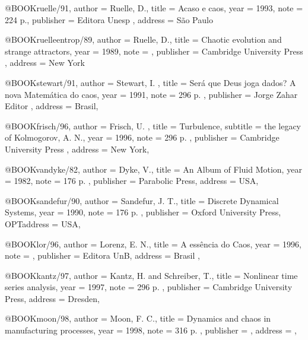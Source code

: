 @BOOK{ruelle/91,
author              = {Ruelle, D.},
title               = {Acaso e caos},
year                = 1993,
note                = {224 p.},
publisher           = {Editora Unesp },
address             = { S\~ao Paulo }
}

@BOOK{ruelleentrop/89,
author              = {Ruelle, D.},
title               = {Chaotic evolution and strange attractors},
year                = 1989,
note                = { },
publisher           = {Cambridge University Press },
address             = { New York }
}

@BOOK{stewart/91,
author              = {Stewart, I. },
title               = {Ser\'a que Deus joga dados? A nova Matem\'atica do caos},
year                = {1991},
note                = {296 p. },
publisher           = {Jorge Zahar Editor },
address             = {Brasil},
}


@BOOK{frisch/96,
author              = {Frisch, U. },
title               = {Turbulence},
subtitle 	    = {the legacy of {Kolmogorov, A. N.}},
year                = {1996},
note                = {296 p. },
publisher           = {Cambridge University Press },
address             = {New York},
}

@BOOK{vandyke/82,
author              = {Dyke, V.},
title               = {An Album of Fluid Motion},
year                = {1982},
note                = {176 p. },
publisher           = {Parabolic Press},
address             = {USA},
}

@BOOK{sandefur/90,
author              = {Sandefur, J. T.},
title               = {Discrete Dynamical Systems},
year                = {1990},
note                = {176 p. },
publisher           = {Oxford University Press},
OPTaddress             = {USA},
}

@BOOK{lor/96,
author              = {Lorenz, E. N.},
title               = {A ess\^encia do Caos},
year                = 1996,
note                = { },
publisher           = {Editora UnB},
address             = { Brasil },
}

@BOOK{kantz/97,
author              = {Kantz, H. and Schreiber, T.},
title               = {Nonlinear time series analysis},
year                = {1997},
note                = {296 p. },
publisher           = {Cambridge University Press},
address             = {Dresden},
}

@BOOK{moon/98,
author              = {Moon, F. C.},
title               = {Dynamics and chaos in manufacturing processes},
year                = {1998},
note                = {316 p. },
publisher           = {},
address             = {},
}

